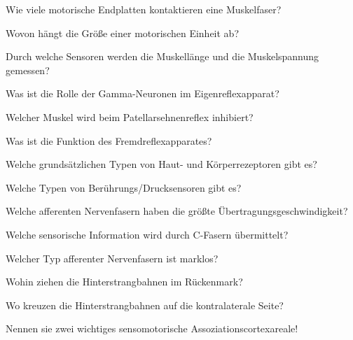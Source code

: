 \documentclass[10pt, a4paper]{exam}
\begin{document}
\begin{questions}
  \begin{solution}
  \end{solution}
  \question Wie viele motorische Endplatten kontaktieren eine Muskelfaser?
  \begin{solution}
  \end{solution}
  \question Wovon hängt die Größe einer motorischen Einheit ab?
  \begin{solution}
  \end{solution}
  \question Durch welche Sensoren werden die Muskellänge und die Muskelspannung gemessen?
  \begin{solution}
  \end{solution}
  \question Was ist die Rolle der Gamma-Neuronen im Eigenreflexapparat?
  \begin{solution}
  \end{solution}
  \question Welcher Muskel wird beim Patellarsehnenreflex inhibiert?
  \begin{solution}
  \end{solution}
  \question Was ist die Funktion des Fremdreflexapparates?
  \begin{solution}
  \end{solution}
  \question Welche grundsätzlichen Typen von Haut- und Körperrezeptoren gibt es?
  \begin{solution}
  \end{solution}
  \question Welche Typen von Berührungs/Drucksensoren gibt es?
  \begin{solution}
  \end{solution}
  \question Welche afferenten Nervenfasern haben die größte Übertragungsgeschwindigkeit?
  \begin{solution}
  \end{solution}
  \question Welche sensorische Information wird durch C-Fasern übermittelt?
  \begin{solution}
  \end{solution}
  \question Welcher Typ afferenter Nervenfasern ist marklos?
  \begin{solution}
  \end{solution}
  \question Wohin ziehen die Hinterstrangbahnen im Rückenmark?
  \begin{solution}
  \end{solution}
  \question Wo kreuzen die Hinterstrangbahnen auf die kontralaterale Seite?
  \begin{solution}
  \end{solution}
  \question Nennen sie zwei wichtiges sensomotorische Assoziationscortexareale!

\end{questions}
\end{document}
